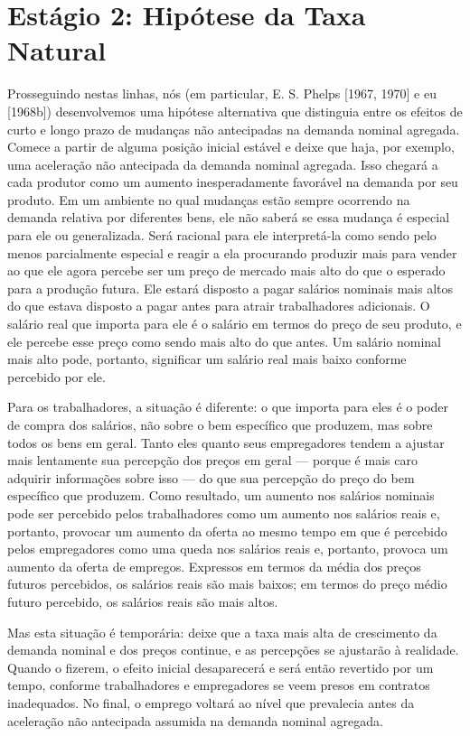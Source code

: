 \documentclass[12pt]{article}
\begin{document}
\section{Estágio 2: Hipótese da Taxa Natural}

Prosseguindo nestas linhas, nós (em particular, E. S. Phelps [1967, 1970] e eu [1968b]) desenvolvemos uma hipótese alternativa que distinguia entre os efeitos de curto e longo prazo de mudanças não antecipadas na demanda nominal agregada. Comece a partir de alguma posição inicial estável e deixe que haja, por exemplo, uma aceleração não antecipada da demanda nominal agregada. Isso chegará a cada produtor como um aumento inesperadamente favorável na demanda por seu produto. Em um ambiente no qual mudanças estão sempre ocorrendo na demanda relativa por diferentes bens, ele não saberá se essa mudança é especial para ele ou generalizada. Será racional para ele interpretá-la como sendo pelo menos parcialmente especial e reagir a ela procurando produzir mais para vender ao que ele agora percebe ser um preço de mercado mais alto do que o esperado para a produção futura. Ele estará disposto a pagar salários nominais mais altos do que estava disposto a pagar antes para atrair trabalhadores adicionais. O salário real que importa para ele é o salário em termos do preço de seu produto, e ele percebe esse preço como sendo mais alto do que antes. Um salário nominal mais alto pode, portanto, significar um salário real mais baixo conforme percebido por ele.

Para os trabalhadores, a situação é diferente: o que importa para eles é o poder de compra dos salários, não sobre o bem específico que produzem, mas sobre todos os bens em geral. Tanto eles quanto seus empregadores tendem a ajustar mais lentamente sua percepção dos preços em geral — porque é mais caro adquirir informações sobre isso — do que sua percepção do preço do bem específico que produzem. Como resultado, um aumento nos salários nominais pode ser percebido pelos trabalhadores como um aumento nos salários reais e, portanto, provocar um aumento da oferta ao mesmo tempo em que é percebido pelos empregadores como uma queda nos salários reais e, portanto, provoca um aumento da oferta de empregos. Expressos em termos da média dos preços futuros percebidos, os salários reais são mais baixos; em termos do preço médio futuro percebido, os salários reais são mais altos.

Mas esta situação é temporária: deixe que a taxa mais alta de crescimento da demanda nominal e dos preços continue, e as percepções se ajustarão à realidade. Quando o fizerem, o efeito inicial desaparecerá e será então revertido por um tempo, conforme trabalhadores e empregadores se veem presos em contratos inadequados. No final, o emprego voltará ao nível que prevalecia antes da aceleração não antecipada assumida na demanda nominal agregada.
\end{document}

